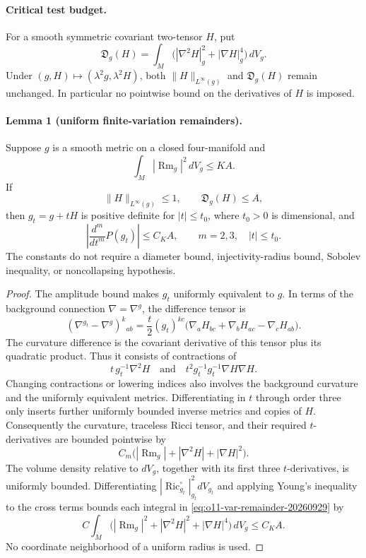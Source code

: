 \paragraph{Critical test budget.}
For a smooth symmetric covariant two-tensor $H$, put
\[
 \mathfrak D_g(H)=\int_M
      \bigl(|\nabla^2H|_g^2+|\nabla H|_g^4\bigr)\,dV_g.
\]
Under $(g,H)\mapsto(\lambda^2g,\lambda^2H)$, both
$\|H\|_{L^\infty(g)}$ and $\mathfrak D_g(H)$ remain unchanged.
In particular no pointwise bound on the derivatives of $H$ is imposed.

\paragraph{Lemma 1 (uniform finite-variation remainders).}
Suppose $g$ is a smooth metric on a closed four-manifold and
\[
 \int_M|\operatorname{Rm}_g|^2\,dV_g\le KA.
\]
If
\[
 \|H\|_{L^\infty(g)}\le1,\qquad \mathfrak D_g(H)\le A,
\]
then $g_t=g+tH$ is positive definite for $|t|\le t_0$, where $t_0>0$
is dimensional, and
\begin{equation}
 \left|\frac{d^m}{dt^m}P(g_t)\right|\le C_K A,
 \qquad m=2,3,\quad |t|\le t_0.
 \label{eq:o11-var-remainder-20260929}
\end{equation}
The constants do not require a diameter bound, injectivity-radius bound,
Sobolev inequality, or noncollapsing hypothesis.

\begin{proof}
The amplitude bound makes $g_t$ uniformly equivalent to $g$. In terms of
the background connection $\nabla=\nabla^g$, the difference tensor is
\[
 (\nabla^{g_t}-\nabla^g)^k{}_{ab}
 =\frac t2(g_t)^{kc}
   \bigl(\nabla_aH_{bc}+\nabla_bH_{ac}-\nabla_cH_{ab}\bigr).
\]
The curvature difference is the covariant derivative of this tensor plus
its quadratic product. Thus it consists of contractions of
\[
 t\,g_t^{-1}\nabla^2H
 \quad\text{and}\quad
 t^2g_t^{-1}g_t^{-1}\nabla H\nabla H.
\]
Changing contractions or lowering indices also involves the background
curvature and the uniformly equivalent metrics. Differentiating in $t$
through order three only inserts further uniformly bounded inverse
metrics and copies of $H$. Consequently the curvature, traceless Ricci
tensor, and their required $t$-derivatives are bounded pointwise by
\[
 C_m\bigl(|\operatorname{Rm}_g|+|\nabla^2H|+|\nabla H|^2\bigr).
\]
The volume density relative to $dV_g$, together with its first three
$t$-derivatives, is uniformly bounded. Differentiating
$|\operatorname{Ric}^{\circ}_{g_t}|_{g_t}^2dV_{g_t}$ and applying Young's
inequality to the cross terms bounds each integral in
\eqref{eq:o11-var-remainder-20260929} by
\[
 C\int_M\bigl(|\operatorname{Rm}_g|^2
                  +|\nabla^2H|^2+|\nabla H|^4\bigr)\,dV_g
 \le C_KA.
\]
No coordinate neighborhood of a uniform radius is used.
\end{proof}

